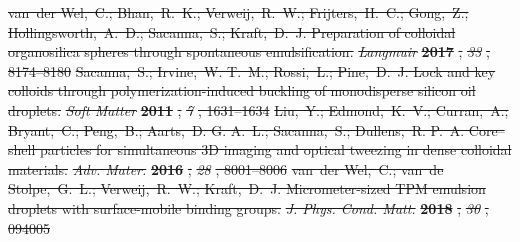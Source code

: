 \documentclass[journal=langd5,manuscript=article]{achemso}
\providecommand{\DIFdel}[1]{{\protect\color{red}\sout{#1}}}                      %
\begin{document}
\DIFdel{van~der Wel,~C.; Bhan,~R.~K.; Verweij,~R.~W.; Frijters,~H.~C.; Gong,~Z.;
  Hollingsworth,~A.~D.; Sacanna,~S.; Kraft,~D.~J. Preparation of colloidal
  organosilica spheres through spontaneous emulsification. }\emph{\DIFdel{Langmuir}}
\textbf{\DIFdel{2017}}%
\DIFdel{, }\emph{\DIFdel{33}}%
\DIFdel{, 8174--8180}%
\DIFdel{Sacanna,~S.; Irvine,~W. T.~M.; Rossi,~L.; Pine,~D.~J. Lock and key colloids
  through polymerization-induced buckling of monodisperse silicon oil droplets.
  }\emph{\DIFdel{Soft Matter}} %
\textbf{\DIFdel{2011}}%
\DIFdel{, }\emph{\DIFdel{7}}%
\DIFdel{, 1631--1634}%
\DIFdel{Liu,~Y.; Edmond,~K.~V.; Curran,~A.; Bryant,~C.; Peng,~B.; Aarts,~D. G. A.~L.;
  Sacanna,~S.; Dullens,~R. P.~A. Core–shell particles for simultaneous 3D
  imaging and optical tweezing in dense colloidal materials. }\emph{\DIFdel{Adv. Mater.}}
\textbf{\DIFdel{2016}}%
\DIFdel{, }\emph{\DIFdel{28}}%
\DIFdel{, 8001--8006}%
\DIFdel{van~der Wel,~C.; van~de Stolpe,~G.~L.; Verweij,~R.~W.; Kraft,~D.~J.
  Micrometer-sized TPM emulsion droplets with surface-mobile binding groups.
  }\emph{\DIFdel{J. Phys. Cond. Matt.}} %
\textbf{\DIFdel{2018}}%
\DIFdel{, }\emph{\DIFdel{30}}%
\DIFdel{, 094005}%
\end{document}
